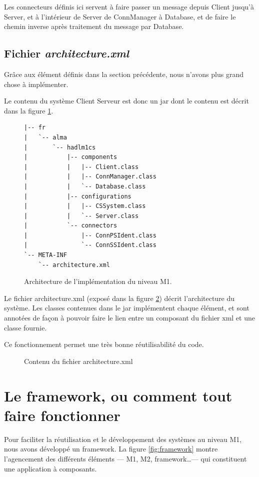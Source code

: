 \documentclass[french,a4paper,titlepage]{article}
\begin{document}
    	Les connecteurs définis ici servent à faire passer un message depuis Client jusqu'à Server, et à l'intérieur de Server de ConnManager à Database, et de faire le chemin inverse après traitement du message par Database.
    
    \subsection{Fichier \emph{architecture.xml}}
	
		Grâce aux élément définis dans la section précédente, nous n'avons plus grand chose à implémenter.
		
		Le contenu du système Client Serveur est donc un jar dont le contenu est décrit dans la figure \ref{fig:m1jar}.
		\begin{figure}[htb]
		\begin{verbatim}
|-- fr
|   `-- alma
|       `-- hadlm1cs
|           |-- components
|           |   |-- Client.class
|           |   |-- ConnManager.class
|           |   `-- Database.class
|           |-- configurations
|           |   |-- CSSystem.class
|           |   `-- Server.class
|           `-- connectors
|               |-- ConnPSIdent.class
|               `-- ConnSSIdent.class
`-- META-INF
    `-- architecture.xml
		\end{verbatim}
		\caption{Architecture de l'implémentation du niveau M1.}
		\label{fig:m1jar}
		\end{figure}
		
		
		Le fichier architecture.xml (exposé dans la figure \ref{fig:architecture.xml}) décrit l'architecture du système. Les classes contenues dans le jar implémentent chaque élément, et sont annotées de façon à pouvoir faire le lien entre un composant du fichier xml et une classe fournie.
		
		Ce fonctionnement permet une très bonne réutilisabilité du code.
		
		
		\begin{figure}[htb]
			\centering
			
			\caption{Contenu du fichier architecture.xml}
			\label{fig:architecture.xml}

		\end{figure}
	
	\section{Le framework, ou comment tout faire fonctionner}
	
		Pour faciliter la réutilisation et le développement des systèmes au niveau M1, nous avons développé un framework. La figure \ref{fig:framework} montre l'agencement des différents éléments --- M1, M2, framework\dots --- qui constituent une application à composants.
		
\end{document}
